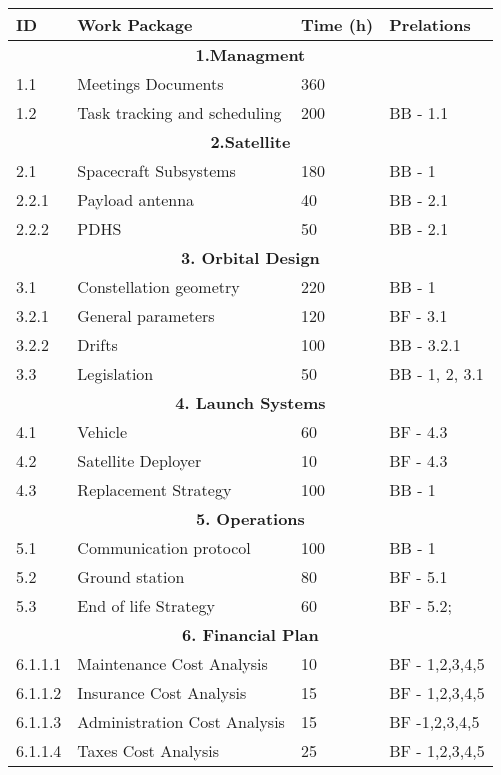 \begin{longtable}{ | p{1.3cm} | p{7cm} | p{3cm} | p{3.5cm} |}
\hline

\textbf{ID }& \textbf{Work Package} & \textbf{Time (h)} & \textbf{Prelations} \\ \hline
\multicolumn{4}{|c|}{\textbf{1.Managment}} \\ \hline
1.1 & Meetings Documents & 360 &   \\ \hline
1.2 & Task tracking and scheduling & 200 & BB - 1.1 \\ \hline
\multicolumn{4}{|c|}{\textbf{2.Satellite}} \\ \hline
2.1 & Spacecraft Subsystems & 180 & BB - 1 \\ \hline
2.2.1 & Payload antenna & 40 & BB - 2.1 \\ \hline
2.2.2 & PDHS & 50 & BB - 2.1 \\ \hline
\multicolumn{4}{|c|}{\textbf{3. Orbital Design}} \\ \hline
3.1 & Constellation geometry & 220 & BB - 1 \\ \hline
3.2.1 & General parameters & 120 & BF - 3.1 \\ \hline
3.2.2 & Drifts & 100 & BB - 3.2.1 \\ \hline
3.3 & Legislation & 50 & BB - 1, 2, 3.1\\ \hline
\multicolumn{4}{|c|}{\textbf{4. Launch Systems}} \\ \hline
4.1 & Vehicle & 60 & BF - 4.3 \\ \hline
4.2 & Satellite Deployer & 10 & BF - 4.3  \\ \hline
4.3 & Replacement Strategy & 100 & BB - 1  \\ \hline
\multicolumn{4}{|c|}{\textbf{5. Operations}} \\ \hline
5.1 & Communication protocol & 100 & BB - 1 \\ \hline
5.2 & Ground station & 80 & BF - 5.1 \\ \hline
5.3 & End of life Strategy & 60 & BF - 5.2; \\
\hline
\multicolumn{4}{|c|}{\textbf{6. Financial Plan}} \\ \hline
6.1.1.1 & Maintenance Cost Analysis & 10 & BF - 1,2,3,4,5 \\ \hline
6.1.1.2 & Insurance Cost Analysis & 15 & BF - 1,2,3,4,5  \\ \hline
6.1.1.3 & Administration Cost Analysis & 15 & BF -1,2,3,4,5 \\ \hline
6.1.1.4 & Taxes Cost Analysis  & 25 & BF - 1,2,3,4,5  \\ \hline

\end{longtable}
